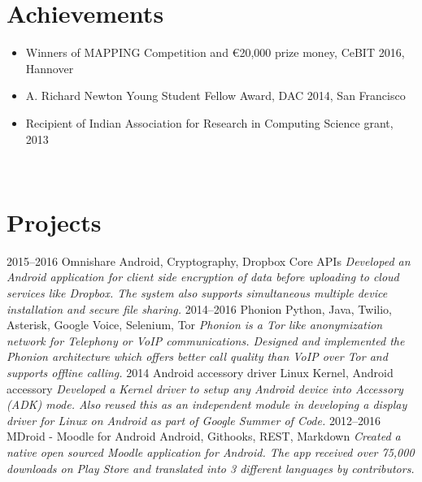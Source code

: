 \documentclass[]{friggeri-cv}
\begin{document}
\section{Achievements}
\begin{itemize}
  \item Winners of MAPPING Competition and \euro 20,000 prize money, CeBIT 2016, Hannover
  \item A. Richard Newton Young Student Fellow Award, DAC 2014, San Francisco
  \item Recipient of Indian Association for Research in Computing Science grant, 2013
\end{itemize}
~

\section{Projects}
\begin{entrylist}
  \entry
    {2015–2016}
    {Omnishare}
    {Android, Cryptography, Dropbox Core APIs}
    {\emph{Developed an Android application for client side encryption of data before uploading to cloud services like Dropbox. The system also supports simultaneous multiple device installation and secure file sharing.}}
  \entry
    {2014–2016}
    {Phonion}
    {Python, Java, Twilio, Asterisk, Google Voice, Selenium, Tor}
    {\emph{Phonion is a Tor like anonymization network for Telephony or VoIP communications. Designed and implemented the Phonion architecture which offers better call quality than VoIP over Tor and supports offline calling.}}
  \entry
    {2014}
    {Android accessory driver}
    {Linux Kernel, Android accessory}
    {\emph{Developed a Kernel driver to setup any Android device into Accessory (ADK) mode. Also reused this as an independent module in developing a display driver for Linux on Android as part of Google Summer of Code.}}
  \entry
    {2012–2016}
    {MDroid - Moodle for Android}
    {Android, Githooks, REST, Markdown}
    {\emph{Created a native open sourced Moodle application for Android. The app received over 75,000 downloads on Play Store and translated into 3 different languages by contributors.}}
\end{entrylist}
\end{document}
